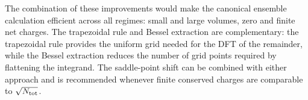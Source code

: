 \documentclass[11pt,a4paper]{article}
\begin{document}
The combination of these improvements would make the canonical ensemble calculation efficient across all regimes: small and large volumes, zero and finite net charges.
The trapezoidal rule and Bessel extraction are complementary: the trapezoidal rule provides the uniform grid needed for the DFT of the remainder, while the Bessel extraction reduces the number of grid points required by flattening the integrand.
The saddle-point shift can be combined with either approach and is recommended whenever finite conserved charges are comparable to $\sqrt{N_{\rm tot}}$.
\end{document}
